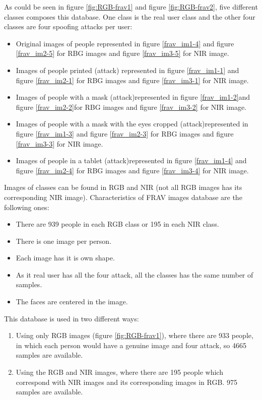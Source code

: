 As could be seen in figure \ref{fig:RGB-frav1} and figure \ref{fig:RGB-frav2}, five different classes composes this database. One class is the real user class and the other four classes are four spoofing attacks per user:

\begin{itemize}
 \item Original images of people represented in figure \ref{frav_im1-4} and figure \ref{frav_im2-5} for RBG images and figure \ref{frav_im3-5} for NIR image.
 \item Images of people printed (attack) represented in figure \ref{frav_im1-1} and figure \ref{frav_im2-1} for RBG images and figure \ref{frav_im3-1} for NIR image.
 \item Images of people with a mask (attack)represented in figure \ref{frav_im1-2}and figure \ref{frav_im2-2}for RBG images and figure \ref{frav_im3-2} for NIR image.
 \item Images of people with a mask with the eyes cropped (attack)represented in figure \ref{frav_im1-3} and figure \ref{frav_im2-3} for RBG images and figure \ref{frav_im3-3} for NIR image.
 \item Images of people in a tablet (attack)represented in figure \ref{frav_im1-4} and figure \ref{frav_im2-4} for RBG images and figure \ref{frav_im3-4} for NIR image.\\
 \end{itemize}

Images of classes can be found in RGB and NIR (not all RGB images has its corresponding NIR image). Characteristics of FRAV images database are the following ones:

\begin{itemize}[noitemsep,topsep=8pt,parsep=0pt,partopsep=20pt]
\item There are 939 people in each RGB class or 195 in each NIR class.
\item There is one image per person.
\item Each image has it is own shape.
\item As it real user has all the four attack, all the classes has the same number of samples.
\item The faces are centered in the image.
\end{itemize}

This database is used in two different ways:

\begin{enumerate}
  \item Using only RGB images (figure \ref{fig:RGB-frav1}), where there are 933 people, in which each person would have a genuine image and four attack, so 4665 samples are available.
  \item Using the RGB and NIR images, where there are 195 people which correspond with NIR images and its corresponding images in RGB. 975 samples are available.
\end{enumerate}

